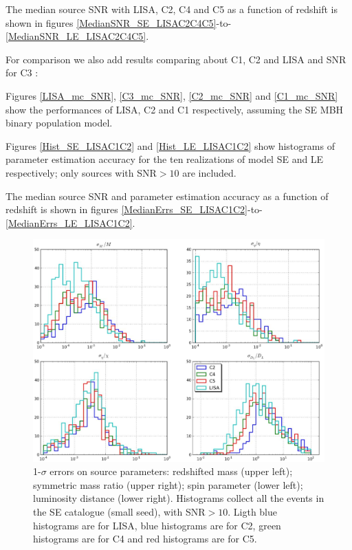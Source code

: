 \documentclass{iopart}
\begin{document}
The median source SNR with LISA, C2, C4 and C5 as a function of redshift is shown in figures \ref{MedianSNR_SE_LISAC2C4C5}-to-\ref{MedianSNR_LE_LISAC2C4C5}.


\vspace{1cm}

For comparison we also add results comparing about C1, C2 and LISA and SNR for C3 : 

Figures \ref{LISA_mc_SNR}, \ref{C3_mc_SNR}, \ref{C2_mc_SNR} and \ref{C1_mc_SNR} show the performances of LISA, C2 and C1 respectively, assuming the SE MBH binary population model.



Figures \ref{Hist_SE_LISAC1C2} and \ref{Hist_LE_LISAC1C2} show histograms of parameter estimation accuracy for the ten realizations of model SE and LE respectively; only sources with SNR$>10$ are included. 
 

The median source SNR and parameter estimation accuracy as a function of redshift is shown in figures \ref{MedianErrs_SE_LISAC1C2}-to-\ref{MedianErrs_LE_LISAC1C2}.



\begin{figure}[H]
\center
   \includegraphics[width=1\textwidth]{FigSMBHPhenomAEI/Hist_SE_LISAC2C4C5.eps}
\caption{1-$\sigma$ errors on source parameters: redshifted mass (upper left); symmetric mass ratio (upper right); spin parameter (lower left); luminosity distance (lower right). Histograms collect all the events in the SE catalogue (small seed), with SNR$>10$. Ligth blue histograms are for LISA, blue histograms are for C2, green histograms are for C4 and red histograms are for C5.
\label{Hist_SE_LISAC2C4C5} } 
\end{figure}
\end{document}
